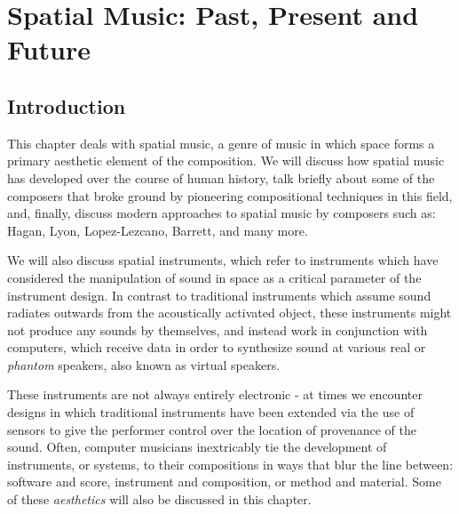 \chapter{Spatial Music: Past, Present and Future} \label{ch:spat-mus} 



\section{Introduction}

This chapter deals with spatial music, a genre of music in which space forms a primary aesthetic element of the composition. We will discuss how spatial music has developed over the course of human history, talk briefly about some of the composers that broke ground by pioneering compositional techniques in this field, and, finally, discuss modern approaches to spatial music by composers such as: Hagan, Lyon, Lopez-Lezcano, Barrett, and many more. 

We will also discuss spatial instruments, which refer to instruments which have considered the manipulation of sound in space as a critical parameter of the instrument design. In contrast to traditional instruments which assume sound radiates outwards from the acoustically activated object, these instruments might not produce any sounds by themselves, and instead work in conjunction with computers, which receive data in order to synthesize sound at various real or \textit{phantom} speakers, also known as virtual speakers. 

These instruments are not always entirely electronic - at times we encounter designs in which traditional instruments have been extended via the use of sensors to give the performer control over the location of provenance of the sound. Often, computer musicians inextricably tie the development of instruments, or systems, to their compositions in ways that blur the line between: software and score, instrument and composition, or method and material. Some of these \textit{aesthetics} will also be discussed in this chapter. 

